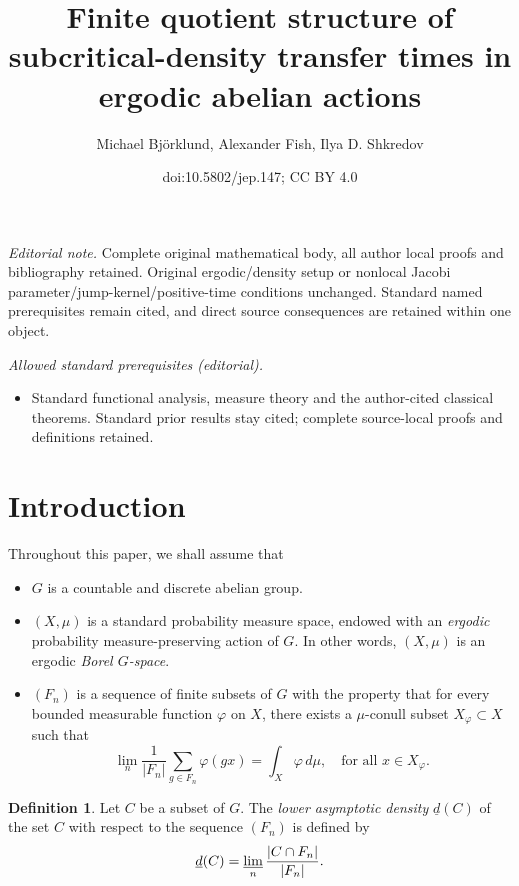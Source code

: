 \documentclass[10pt]{amsart}
\title{Finite quotient structure of subcritical-density transfer times in ergodic abelian actions}
\author{Michael Björklund, Alexander Fish, Ilya D. Shkredov}
\date{doi:10.5802/jep.147; CC BY 4.0}
\theoremstyle{plain}
\theoremstyle{definition}
\newtheorem{definition}[theorem]{Definition}
\begin{document}
\maketitle
\noindent\textit{Editorial note.} Complete original mathematical body, all author local proofs and bibliography retained. Original ergodic/density setup or nonlocal Jacobi parameter/jump-kernel/positive-time conditions unchanged. Standard named prerequisites remain cited, and direct source consequences are retained within one object.\par\medskip
\noindent\textit{Allowed standard prerequisites (editorial).}\begin{itemize}
\item Standard functional analysis, measure theory and the author-cited classical theorems. Standard prior results stay cited; complete source-local proofs and definitions retained.
\end{itemize}\medskip
\vspace*{-1.5\baselineskip}
\tableofcontents


\vspace*{-1.5\baselineskip}
\vskip0pt\enlargethispage{.5\baselineskip}%
\section{Introduction}

Throughout this paper, we shall assume that
\begin{itemize}
\item $G$ is a countable and discrete abelian group.

\item $(X,\mu)$ is a standard probability measure space, endowed with an \emph{ergodic} probability measure-preserving action of $G$.
In other words, $(X,\mu)$ is an ergodic \emph{Borel $G$-space}.

\item $(F_n)$ is a sequence of finite subsets of $G$ with the property that for every bounded measurable function $\varphi$ on $X$, there
exists a $\mu$-conull subset $X_\varphi \subset X$ such that
\begin{equation}
\label{pointwise}
\lim_n \frac{1}{|F_n|} \sum_{g \in F_n} \varphi(gx) = \int_X \varphi \, d\mu, \quad \textrm{for all $x \in X_\varphi$}.
\end{equation}
\end{itemize}

\begin{definition}
Let $C$ be a subset of $G$. The \emph{lower asymptotic density} $\underline{d}(C)$ of the set $C$ with respect to the sequence $(F_n)$ is defined by
\begin{equation}
\label{def_lad}
\underline{d}(C) = \varliminf_n \frac{|C \cap F_n|}{|F_n|}.
\end{equation}
\end{definition}
\end{document}
